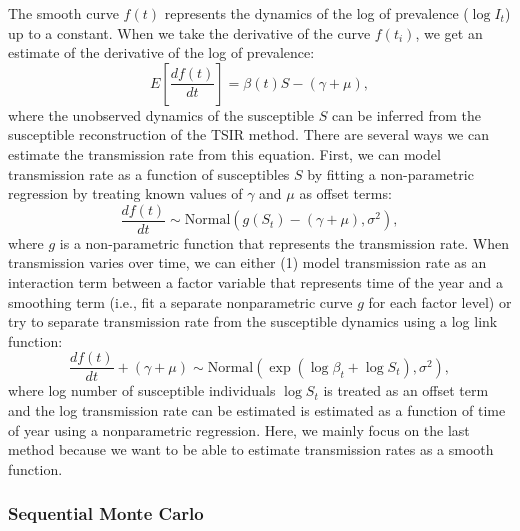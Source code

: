 \documentclass{article}
\begin{document}
The smooth curve $f(t)$ represents the dynamics of the log of prevalence ($\log I_t$) up to a constant.
When we take the derivative of the curve $f(t_i)$, we get an estimate of the derivative of the log of prevalence:
\begin{equation}
E\left[\frac{df(t)}{dt}\right] = \beta(t) S - (\gamma + \mu),
\end{equation}
where the unobserved dynamics of the susceptible $S$ can be inferred from the susceptible reconstruction of the TSIR method.
There are several ways we can estimate the transmission rate from this equation.
First, we can model transmission rate as a function of susceptibles $S$ by fitting a non-parametric regression by treating known values of $\gamma$ and $\mu$ as offset terms:
\begin{equation}
\frac{df(t)}{dt} \sim \mathrm{Normal}(g(S_t) - (\gamma + \mu), \sigma^2),
\end{equation}
where $g$ is a non-parametric function that represents the transmission rate.
When transmission varies over time, we can either (1) model transmission rate as an interaction term between a factor variable that represents time of the year and a smoothing term (i.e., fit a separate nonparametric curve $g$ for each factor level) or try to separate transmission rate from the susceptible dynamics using a log link function:
\begin{equation}
\frac{d f(t)}{dt} + (\gamma + \mu) \sim \mathrm{Normal}\left(\exp \left(\log \beta_t + \log S_t\right), \sigma^2\right),
\end{equation}
where log number of susceptible individuals $\log S_t$ is treated as an offset term and the log transmission rate can be estimated is estimated as a function of time of year using a nonparametric regression.
Here, we mainly focus on the last method because we want to be able to estimate transmission rates as a smooth function.

\subsubsection*{Sequential Monte Carlo}
\end{document}
